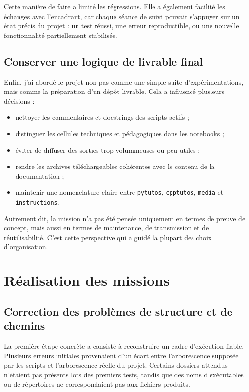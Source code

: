 \documentclass[a4paper,12pt,twoside]{article}
\begin{document}
Cette manière de faire a limité les régressions. Elle a également facilité les échanges avec l'encadrant, car chaque séance de suivi pouvait s'appuyer sur un état précis du projet : un test réussi, une erreur reproductible, ou une nouvelle fonctionnalité partiellement stabilisée.

\subsection{Conserver une logique de livrable final}

Enfin, j'ai abordé le projet non pas comme une simple suite d'expérimentations, mais comme la préparation d'un dépôt livrable. Cela a influencé plusieurs décisions :
\begin{itemize}
    \item nettoyer les commentaires et docstrings des scripts actifs ;
    \item distinguer les cellules techniques et pédagogiques dans les notebooks ;
    \item éviter de diffuser des sorties trop volumineuses ou peu utiles ;
    \item rendre les archives téléchargeables cohérentes avec le contenu de la documentation ;
    \item maintenir une nomenclature claire entre \texttt{pytutos}, \texttt{cpptutos}, \texttt{media} et \texttt{instructions}.
\end{itemize}

Autrement dit, la mission n'a pas été pensée uniquement en termes de preuve de concept, mais aussi en termes de maintenance, de transmission et de réutilisabilité. C'est cette perspective qui a guidé la plupart des choix d'organisation.

\section{Réalisation des missions}

\subsection{Correction des problèmes de structure et de chemins}

La première étape concrète a consisté à reconstruire un cadre d'exécution fiable. Plusieurs erreurs initiales provenaient d'un écart entre l'arborescence supposée par les scripts et l'arborescence réelle du projet. Certains dossiers attendus n'étaient pas présents lors des premiers tests, tandis que des noms d'exécutables ou de répertoires ne correspondaient pas aux fichiers produits.
\end{document}
